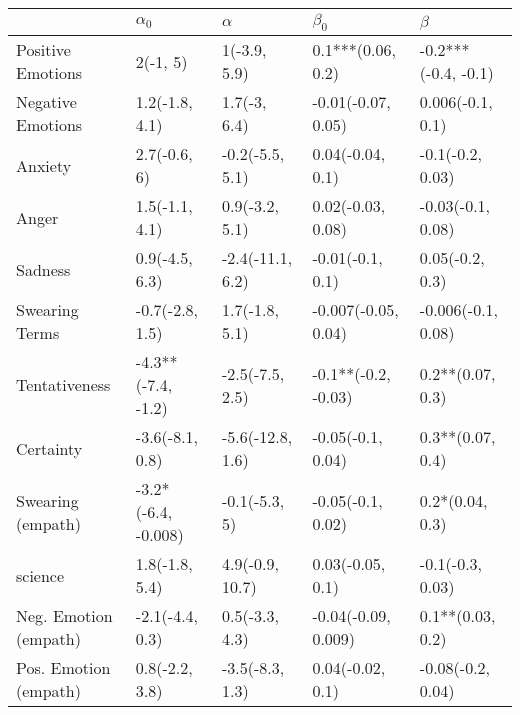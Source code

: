 \begin{tabular}{lllll}
\toprule
{} &           $\alpha_0$ &          $\alpha$ &            $\beta_0$ &              $\beta$ \\
\midrule
Positive Emotions     &             2(-1, 5) &      1(-3.9, 5.9) &    0.1***(0.06, 0.2) &  -0.2***(-0.4, -0.1) \\
Negative Emotions     &       1.2(-1.8, 4.1) &      1.7(-3, 6.4) &   -0.01(-0.07, 0.05) &     0.006(-0.1, 0.1) \\
Anxiety               &         2.7(-0.6, 6) &   -0.2(-5.5, 5.1) &     0.04(-0.04, 0.1) &     -0.1(-0.2, 0.03) \\
Anger                 &       1.5(-1.1, 4.1) &    0.9(-3.2, 5.1) &    0.02(-0.03, 0.08) &    -0.03(-0.1, 0.08) \\
Sadness               &       0.9(-4.5, 6.3) &  -2.4(-11.1, 6.2) &     -0.01(-0.1, 0.1) &      0.05(-0.2, 0.3) \\
Swearing Terms        &      -0.7(-2.8, 1.5) &    1.7(-1.8, 5.1) &  -0.007(-0.05, 0.04) &   -0.006(-0.1, 0.08) \\
Tentativeness         &   -4.3**(-7.4, -1.2) &   -2.5(-7.5, 2.5) &  -0.1**(-0.2, -0.03) &     0.2**(0.07, 0.3) \\
Certainty             &      -3.6(-8.1, 0.8) &  -5.6(-12.8, 1.6) &    -0.05(-0.1, 0.04) &     0.3**(0.07, 0.4) \\
Swearing (empath)     &  -3.2*(-6.4, -0.008) &     -0.1(-5.3, 5) &    -0.05(-0.1, 0.02) &      0.2*(0.04, 0.3) \\
science               &       1.8(-1.8, 5.4) &   4.9(-0.9, 10.7) &     0.03(-0.05, 0.1) &     -0.1(-0.3, 0.03) \\
Neg. Emotion (empath) &      -2.1(-4.4, 0.3) &    0.5(-3.3, 4.3) &  -0.04(-0.09, 0.009) &     0.1**(0.03, 0.2) \\
Pos. Emotion (empath) &       0.8(-2.2, 3.8) &   -3.5(-8.3, 1.3) &     0.04(-0.02, 0.1) &    -0.08(-0.2, 0.04) \\
\bottomrule
\end{tabular}

